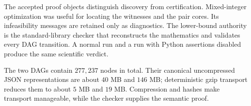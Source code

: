 

The accepted proof objects distinguish discovery from certification.
Mixed-integer optimization was useful for locating the witnesses and the
pair cores.  Its infeasibility messages are retained only as diagnostics.
The lower-bound authority is the standard-library checker that reconstructs
the mathematics and validates every DAG transition.  A normal run and a run
with Python assertions disabled produce the same scientific verdict.

The two DAGs contain $277{,}237$ nodes in total.  Their canonical uncompressed
JSON representations are about $40$ MB and $146$ MB; deterministic gzip
transport reduces them to about $5$ MB and $19$ MB.  Compression and hashes
make transport manageable, while the checker supplies the semantic proof.
